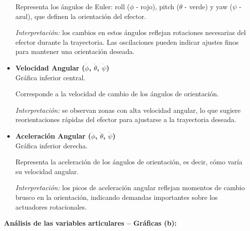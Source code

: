 \begin{itemize}
	Representa los ángulos de Euler: roll ($\phi$ - rojo), pitch ($\theta$ - verde) y yaw ($\psi$ - azul), que definen la orientación del efector.
	
	\textit{Interpretación:} los cambios en estos ángulos reflejan rotaciones necesarias del efector durante la trayectoria. Las oscilaciones pueden indicar ajustes finos para mantener una orientación deseada.
	
	\item \textbf{Velocidad Angular ($\dot{\phi}$, $\dot{\theta}$, $\dot{\psi}$)}\\
	Gráfica inferior central.
	
	Corresponde a la velocidad de cambio de los ángulos de orientación.
	
	\textit{Interpretación:} se observan zonas con alta velocidad angular, lo que sugiere reorientaciones rápidas del efector para ajustarse a la trayectoria deseada.
	
	\item \textbf{Aceleración Angular ($\ddot{\phi}$, $\ddot{\theta}$, $\ddot{\psi}$)}\\
	Gráfica inferior derecha.
	
	Representa la aceleración de los ángulos de orientación, es decir, cómo varía su velocidad angular.
	
	\textit{Interpretación:} los picos de aceleración angular reflejan momentos de cambio brusco en la orientación, indicando demandas importantes sobre los actuadores rotacionales.
	
\end{itemize}

\vspace{1em}

\noindent \textbf{Análisis de las variables articulares – Gráficas (b):}

